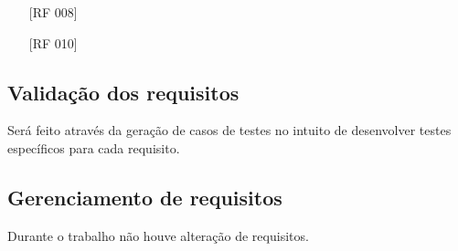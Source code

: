 \documentclass[ppginf, pep]{esinucpel}
\begin{document}
\begin{itemize}
\item[\textbullet] [RF 008]
\item[\textbullet] [RF 010]
\end{itemize}

\subsection{Validação dos requisitos}

Será feito através da geração de casos de testes no intuito de desenvolver testes específicos para cada requisito.

\subsection{Gerenciamento de requisitos}

Durante o trabalho não houve alteração de requisitos.






\end{document}
